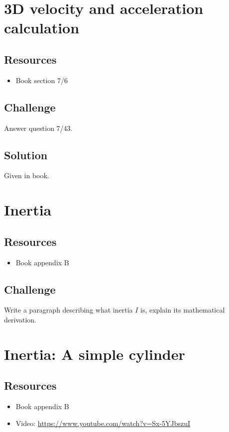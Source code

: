 \newpage
\section{3D velocity and acceleration calculation}

\subsection*{Resources}
\begin{itemize}
    \item Book section 7/6
\end{itemize}

\subsection*{Challenge}
Answer question 7/43.

\subsection*{Solution}
Given in book.




\newpage
\section{Inertia}

\subsection*{Resources}
\begin{itemize}
    \item Book appendix B
\end{itemize}

\subsection*{Challenge}
Write a paragraph describing what inertia $I$ is, explain its mathematical derivation.




\newpage
\section{Inertia: A simple cylinder}

\subsection*{Resources}
\begin{itemize}
    \item Book appendix B
    \item Video: \url{https://www.youtube.com/watch?v=Sx-5YJbszuI}
\end{itemize}

